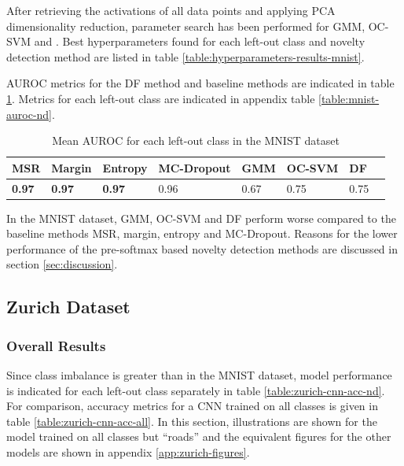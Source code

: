 \documentclass[10pt]{article}
\begin{document}
After retrieving the activations of all data points and applying \gls{PCA} dimensionality reduction, parameter search has been performed for \gls{GMM}, \gls{OC-SVM} and . Best hyperparameters found for each left-out class and novelty detection method are listed in table \ref{table:hyperparameters-results-mnist}.

\gls{AUROC} metrics for the \acrlong{DF} method and baseline methods are indicated in table \ref{table:mnist-auroc-nd-mean}. Metrics for each left-out class are indicated in appendix table \ref{table:mnist-auroc-nd}.

\begin{table}[H]
    \centering
    \begin{tabular}{@{}llllllll@{}}
    \toprule
     \gls{MSR}  & Margin & Entropy & \gls{MC-Dropout} & \gls{GMM} & \gls{OC-SVM}  & \gls{DF} \\ \midrule
    \textbf{0.97} & \textbf{0.97} & \textbf{0.97} & 0.96 & 0.67 & 0.75 & 0.75 \\\bottomrule
    \end{tabular}
    \caption{Mean \gls{AUROC} for each left-out class in the \gls{MNIST} dataset}
    \label{table:mnist-auroc-nd-mean}
\end{table}

In the \gls{MNIST} dataset, \gls{GMM}, \gls{OC-SVM} and \gls{DF} perform worse compared to the baseline methods \gls{MSR}, margin, entropy and \gls{MC-Dropout}. Reasons for the lower performance of the pre-softmax based novelty detection methods are discussed in section \ref{sec:discussion}.


\subsection{Zurich Dataset}
\label{subsec:results-zurich}

\subsubsection{Overall Results}
Since class imbalance is greater than in the \gls{MNIST} dataset, model performance is indicated for each left-out class separately in table \ref{table:zurich-cnn-acc-nd}. For comparison, accuracy metrics for a \gls{CNN} trained on all classes is given in table \ref{table:zurich-cnn-acc-all}. In this section, illustrations are shown for the model trained on all classes but ``roads'' and the equivalent figures for the other models are shown in appendix \ref{app:zurich-figures}.
\end{document}
